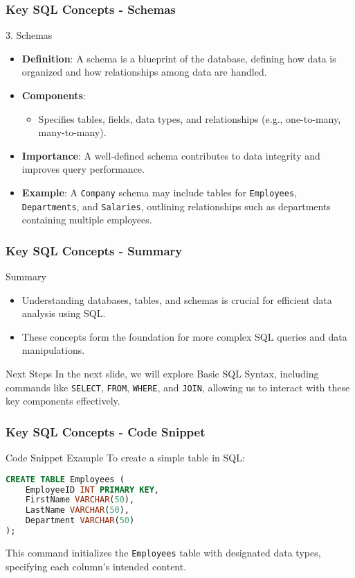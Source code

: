 \documentclass{beamer}
\begin{document}
\begin{frame}[fragile]
    \frametitle{Key SQL Concepts - Schemas}
    \begin{block}{3. Schemas}
        \begin{itemize}
            \item \textbf{Definition}: A schema is a blueprint of the database, defining how data is organized and how relationships among data are handled.
            \item \textbf{Components}:
            \begin{itemize}
                \item Specifies tables, fields, data types, and relationships (e.g., one-to-many, many-to-many).
            \end{itemize}
            \item \textbf{Importance}: A well-defined schema contributes to data integrity and improves query performance.
            \item \textbf{Example}: A \texttt{Company} schema may include tables for \texttt{Employees}, \texttt{Departments}, and \texttt{Salaries}, outlining relationships such as departments containing multiple employees.
        \end{itemize}
    \end{block}
\end{frame}

\begin{frame}[fragile]
    \frametitle{Key SQL Concepts - Summary}
    \begin{block}{Summary}
        \begin{itemize}
            \item Understanding databases, tables, and schemas is crucial for efficient data analysis using SQL.
            \item These concepts form the foundation for more complex SQL queries and data manipulations.
        \end{itemize}
    \end{block}
    \begin{block}{Next Steps}
        In the next slide, we will explore Basic SQL Syntax, including commands like \texttt{SELECT}, \texttt{FROM}, \texttt{WHERE}, and \texttt{JOIN}, allowing us to interact with these key components effectively.
    \end{block}
\end{frame}

\begin{frame}[fragile]
    \frametitle{Key SQL Concepts - Code Snippet}
    \begin{block}{Code Snippet Example}
        To create a simple table in SQL:
        \begin{lstlisting}[language=SQL]
CREATE TABLE Employees (
    EmployeeID INT PRIMARY KEY,
    FirstName VARCHAR(50),
    LastName VARCHAR(50),
    Department VARCHAR(50)
);
        \end{lstlisting}
        This command initializes the \texttt{Employees} table with designated data types, specifying each column's intended content.
    \end{block}
\end{frame}
\end{document}
